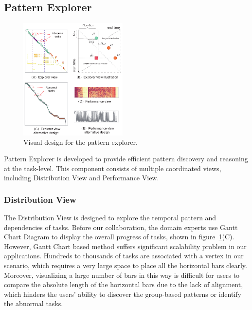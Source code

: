 \subsection{Pattern Explorer}


\begin{figure}[t]
	\centering
	\includegraphics[width=0.48\textwidth]{figures/visualization/patternexplorer.pdf}
	\vspace{-3mm}
	\caption{Visual design for the pattern explorer.}
	\label{fig:explorer}
	\vspace{-3mm}
\end{figure}


Pattern Explorer is developed to provide efficient pattern discovery and reasoning at the task-level. This component consists of multiple coordinated views, including Distribution View and Performance View.
\subsubsection{Distribution View}
The Distribution View is designed to explore the temporal pattern and dependencies of tasks.
Before our collaboration, the domain experts use Gantt Chart Diagram to display the overall progress of tasks, shown in figure~\ref{fig:explorer}(C). 
However, Gantt Chart based method suffers significant scalability problem in our applications. Hundreds to thousands of tasks are associated with a vertex in our scenario, which requires a very large space to place all the horizontal bars clearly. 
Moreover, visualizing a large number of bars in this way is difficult for users to compare the absolute length of the horizontal bars due to the lack of alignment, which hinders the users' ability to discover the group-based patterns or identify the abnormal tasks.


